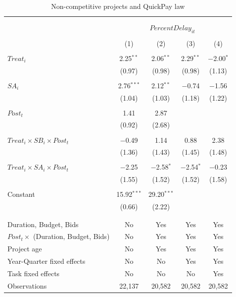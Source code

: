 \documentclass[
]{article}
\begin{document}
\begin{table}[H] \centering 
  \caption{Non-competitive projects and QuickPay law} 
  \label{} 
\small 
\begin{tabular}{@{\extracolsep{-2pt}}lcccc} 
\\[-1.8ex]\hline 
\hline \\[-1.8ex] 
\\[-1.8ex] & \multicolumn{4}{c}{$PercentDelay_{it}$  } \\ 
\\[-1.8ex] & (1) & (2) & (3) & (4)\\ 
\hline \\[-1.8ex] 
 $Treat_i$ & 2.25$^{**}$ & 2.06$^{**}$ & 2.29$^{**}$ & $-$2.00$^{*}$ \\ 
  & (0.97) & (0.98) & (0.98) & (1.13) \\ 
  & & & & \\ 
 $SA_i$ & 2.76$^{***}$ & 2.12$^{**}$ & $-$0.74 & $-$1.56 \\ 
  & (1.04) & (1.03) & (1.18) & (1.22) \\ 
  & & & & \\ 
 $Post_t$ & 1.41 & 2.87 &  &  \\ 
  & (0.92) & (2.68) &  &  \\ 
  & & & & \\ 
 $Treat_i \times SB_i \times Post_t$ & $-$0.49 & 1.14 & 0.88 & 2.38 \\ 
  & (1.36) & (1.43) & (1.45) & (1.48) \\ 
  & & & & \\ 
 $Treat_i \times SA_i \times Post_t$ & $-$2.25 & $-$2.58$^{*}$ & $-$2.54$^{*}$ & $-$0.23 \\ 
  & (1.55) & (1.52) & (1.52) & (1.58) \\ 
  & & & & \\ 
 Constant & 15.92$^{***}$ & 29.20$^{***}$ &  &  \\ 
  & (0.66) & (2.22) &  &  \\ 
  & & & & \\ 
\hline \\[-1.8ex] 
Duration, Budget, Bids & No & Yes & Yes & Yes \\ 
$Post_t \times $  (Duration, Budget, Bids) & No & Yes & Yes & Yes \\ 
Project age & No & Yes & Yes & Yes \\ 
Year-Quarter fixed effects & No & No & Yes & Yes \\ 
Task fixed effects & No & No & No & Yes \\ 
Observations & 22,137 & 20,582 & 20,582 & 20,582 \\ 

\end{tabular}
\end{table}
\end{document}
